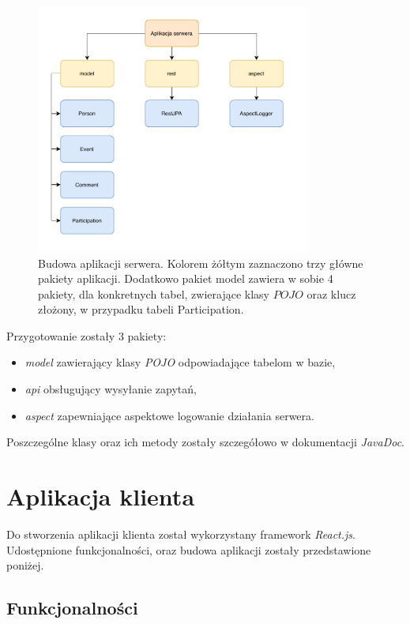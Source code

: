 \documentclass[12pt]{article}
\begin{document}
\begin{figure}[H]
\centering
\includegraphics[width=0.8\textwidth]{server.pdf}
\caption{Budowa aplikacji serwera. Kolorem żółtym zaznaczono trzy główne pakiety aplikacji. Dodatkowo pakiet model zawiera w sobie 4 pakiety, dla konkretnych tabel, zwierające klasy $POJO$ oraz klucz złożony, w przypadku tabeli Participation.}
\end{figure}

Przygotowanie zostały 3 pakiety: 
\begin{itemize}
\item \textit{model} zawierający klasy \textit{POJO} odpowiadające tabelom w bazie,
\item \textit{api} obsługujący wysyłanie zapytań,
\item \textit{aspect} zapewniające aspektowe logowanie działania serwera.
\end{itemize}

Poszczególne klasy oraz ich metody zostały szczegółowo w dokumentacji \textit{JavaDoc}.

\pagebreak
\section{Aplikacja klienta}
Do stworzenia aplikacji klienta został wykorzystany framework \textit{React.js}. Udostępnione funkcjonalności, oraz budowa aplikacji zostały przedstawione poniżej. 

\subsection{Funkcjonalności}
\end{document}
